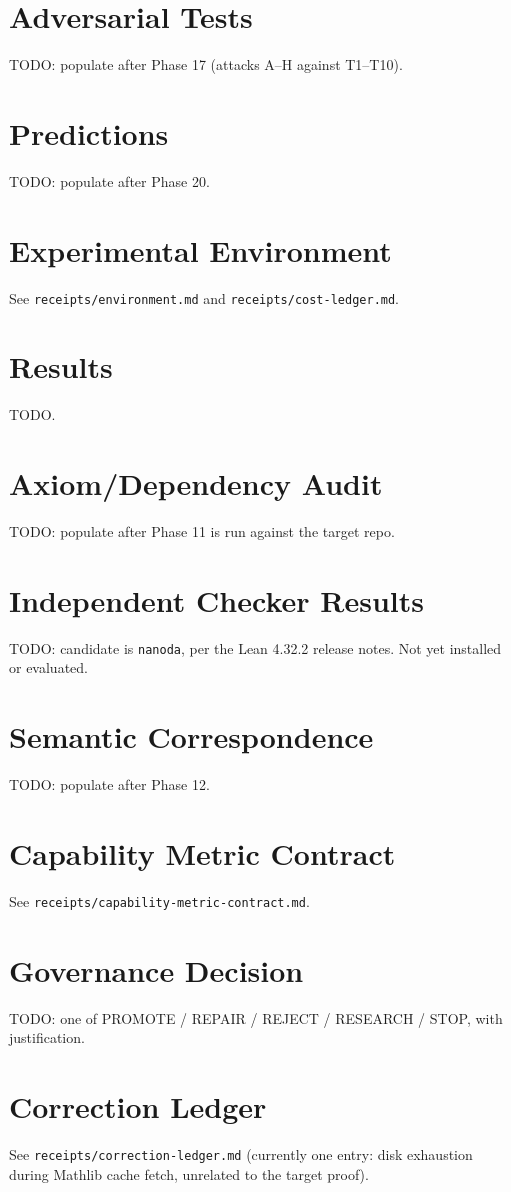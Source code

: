 \documentclass[11pt]{article}
\begin{document}
\section{Adversarial Tests}
TODO: populate after Phase 17 (attacks A--H against T1--T10).

\section{Predictions}
TODO: populate after Phase 20.

\section{Experimental Environment}
See \texttt{receipts/environment.md} and \texttt{receipts/cost-ledger.md}.

\section{Results}
TODO.

\section{Axiom/Dependency Audit}
TODO: populate after Phase 11 is run against the target repo.

\section{Independent Checker Results}
TODO: candidate is \texttt{nanoda}, per the Lean 4.32.2 release notes. Not yet
installed or evaluated.

\section{Semantic Correspondence}
TODO: populate after Phase 12.

\section{Capability Metric Contract}
See \texttt{receipts/capability-metric-contract.md}.

\section{Governance Decision}
TODO: one of PROMOTE / REPAIR / REJECT / RESEARCH / STOP, with justification.

\section{Correction Ledger}
See \texttt{receipts/correction-ledger.md} (currently one entry: disk exhaustion
during Mathlib cache fetch, unrelated to the target proof).
\end{document}
